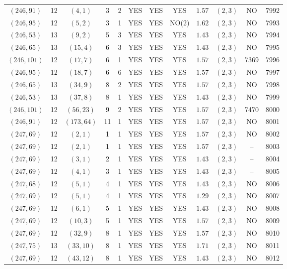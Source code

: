 \begin{longtable}{|c|c|c|c|c|c|c|c|c|c|c|c|}
$(246,91)$ & 12 & $(4,1)$ & 3 & 2 & YES & YES & YES & $1.57$ & $(2,3)$ & NO & 7992\\
$(246,95)$ & 12 & $(5,2)$ & 3 & 1 & YES & YES & NO(2) & $1.62$ & $(2,3)$ & NO & 7993\\
$(246,53)$ & 13 & $(9,2)$ & 5 & 3 & YES & YES & YES & $1.43$ & $(2,3)$ & NO & 7994\\
$(246,65)$ & 13 & $(15,4)$ & 6 & 3 & YES & YES & YES & $1.43$ & $(2,3)$ & NO & 7995\\
$(246,101)$ & 12 & $(17,7)$ & 6 & 1 & YES & YES & YES & $1.57$ & $(2,3)$ & 7369 & 7996\\
$(246,95)$ & 12 & $(18,7)$ & 6 & 6 & YES & YES & YES & $1.57$ & $(2,3)$ & NO & 7997\\
$(246,65)$ & 13 & $(34,9)$ & 8 & 2 & YES & YES & YES & $1.57$ & $(2,3)$ & NO & 7998\\
$(246,53)$ & 13 & $(37,8)$ & 8 & 1 & YES & YES & YES & $1.43$ & $(2,3)$ & NO & 7999\\
$(246,101)$ & 12 & $(56,23)$ & 9 & 2 & YES & YES & YES & $1.57$ & $(2,3)$ & 7470 & 8000\\
$(246,91)$ & 12 & $(173,64)$ & 11 & 1 & YES & YES & YES & $1.57$ & $(2,3)$ & NO & 8001\\
$(247,69)$ & 12 & $(2,1)$ & 1 & 1 & YES & YES & YES & $1.57$ & $(2,3)$ & NO & 8002\\
$(247,69)$ & 12 & $(2,1)$ & 1 & 1 & YES & YES & YES & $1.57$ & $(2,3)$ & -- & 8003\\
$(247,69)$ & 12 & $(3,1)$ & 2 & 1 & YES & YES & YES & $1.43$ & $(2,3)$ & -- & 8004\\
$(247,69)$ & 12 & $(4,1)$ & 3 & 1 & YES & YES & YES & $1.43$ & $(2,3)$ & -- & 8005\\
$(247,68)$ & 12 & $(5,1)$ & 4 & 1 & YES & YES & YES & $1.43$ & $(2,3)$ & NO & 8006\\
$(247,69)$ & 12 & $(5,1)$ & 4 & 1 & YES & YES & YES & $1.29$ & $(2,3)$ & NO & 8007\\
$(247,69)$ & 12 & $(6,1)$ & 5 & 1 & YES & YES & YES & $1.43$ & $(2,3)$ & NO & 8008\\
$(247,69)$ & 12 & $(10,3)$ & 5 & 1 & YES & YES & YES & $1.57$ & $(2,3)$ & NO & 8009\\
$(247,69)$ & 12 & $(32,9)$ & 8 & 1 & YES & YES & YES & $1.57$ & $(2,3)$ & NO & 8010\\
$(247,75)$ & 13 & $(33,10)$ & 8 & 1 & YES & YES & YES & $1.71$ & $(2,3)$ & NO & 8011\\
$(247,69)$ & 12 & $(43,12)$ & 8 & 1 & YES & YES & YES & $1.43$ & $(2,3)$ & NO & 8012\\

\end{longtable}
